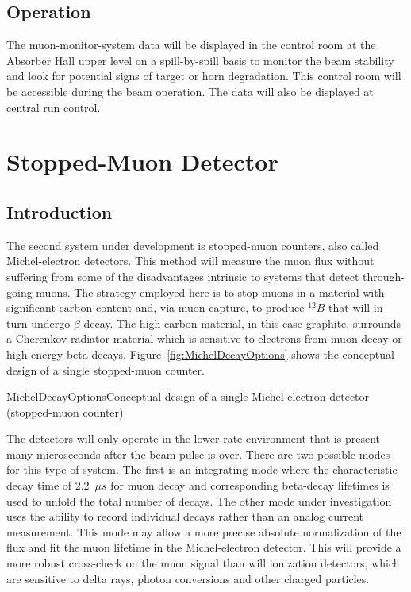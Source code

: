 \subsection{Operation}

The muon-monitor-system data will be displayed in the control room 
at the Absorber Hall upper level on
a spill-by-spill basis to monitor the beam stability and look for potential signs of target or horn degradation. 
This control room will be accessible during the beam operation.
The data will also be displayed at central run control.  

%
%
\section{Stopped-Muon Detector} %
\label{v3ch3-stop-mu-det}
\subsection{Introduction}

The second system under development is stopped-muon counters, also called
Michel-electron detectors. This method will measure the muon flux without
suffering from some of the disadvantages intrinsic to systems that
detect through-going muons. The strategy employed here is to stop muons
in a material with significant carbon content 
and, via muon capture, to produce $^{12}B$ that will in turn undergo $\beta$ decay.
 The high-carbon material, in this case graphite, surrounds a Cherenkov radiator
material which is sensitive to electrons from muon decay or 
high-energy beta decays.  Figure~\ref{fig:MichelDecayOptions} shows the conceptual design 
of a 
single stopped-muon counter. 


\begin{cdrfigure}{MichelDecayOptions}{Conceptual design of a single Michel-electron detector (stopped-muon counter)}
\end{cdrfigure}

The detectors will only operate in the lower-rate
environment that is present many microseconds after the beam pulse is
over. There are two possible modes for this type of system. 
The first is an integrating mode where the characteristic decay time of 
2.2~$\mu s$ for muon decay and corresponding beta-decay lifetimes is used to
unfold the total number of decays. The other mode under
investigation uses the ability to record individual decays rather
than an analog current measurement. This mode may allow a more precise absolute
normalization of the flux and fit the muon lifetime in the Michel-electron detector. 
This will provide a more robust cross-check on the
muon signal than will ionization detectors, which are sensitive to delta
rays, photon conversions and other charged particles.

